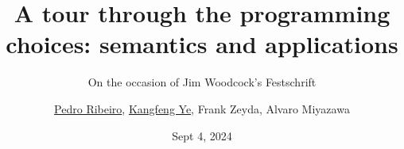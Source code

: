 \documentclass[%
slidestop,%
compress,%
mathserif,%
table,%
usenames,%
aspectratio=169,
dvipsnames,%
]{beamer}%
\begin{document}

\title[Programming choices]{{\Large A tour through the programming choices: semantics and applications}}
\subtitle{\large On the occasion of Jim Woodcock's Festschrift}


\author[\underline{Pedro Ribeiro} et al.]
{\normalsize \underline{Pedro Ribeiro}, \underline{Kangfeng Ye}, Frank Zeyda, Alvaro Miyazawa}


\date{\small Sept 4, 2024}


%

\end{document}
